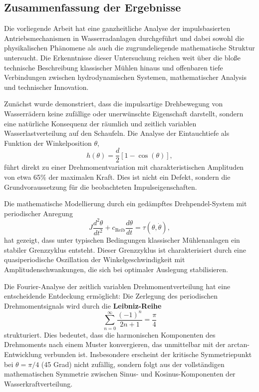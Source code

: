 \documentclass[a4paper,12pt]{article}
\theoremstyle{definition}
\begin{document}
\subsection{Zusammenfassung der Ergebnisse}

Die vorliegende Arbeit hat eine ganzheitliche Analyse der impulsbasierten Antriebsmechanismen in Wasserradanlagen durchgeführt und dabei sowohl die physikalischen Phänomene als auch die zugrundeliegende mathematische Struktur untersucht. Die Erkenntnisse dieser Untersuchung reichen weit über die bloße technische Beschreibung klassischer Mühlen hinaus und offenbaren tiefe Verbindungen zwischen hydrodynamischen Systemen, mathematischer Analysis und technischer Innovation.

Zunächst wurde demonstriert, dass die impulsartige Drehbewegung von Wasserrädern keine zufällige oder unerwünschte Eigenschaft darstellt, sondern eine natürliche Konsequenz der räumlich und zeitlich variablen Wasserlastverteilung auf den Schaufeln. Die Analyse der Eintauchtiefe als Funktion der Winkelposition $\theta$,
\begin{equation}
  h(\theta) = \frac{d}{2}[1 - \cos(\theta)],
\end{equation}
führt direkt zu einer Drehmomentvariation mit charakteristischen Amplituden von etwa 65\% der maximalen Kraft. Dies ist nicht ein Defekt, sondern die Grundvoraussetzung für die beobachteten Impulseigenschaften.

Die mathematische Modellierung durch ein gedämpftes Drehpendel-System mit periodischer Anregung
\begin{equation}
  J \frac{d^2\theta}{dt^2} + c_{\text{Reib}} \frac{d\theta}{dt} = \tau(\theta, \dot{\theta}),
\end{equation}
hat gezeigt, dass unter typischen Bedingungen klassischer Mühlenanlagen ein stabiler Grenzzyklus entsteht. Dieser Grenzzyklus ist charakterisiert durch eine quasiperiodische Oszillation der Winkelgeschwindigkeit mit Amplitudenschwankungen, die sich bei optimaler Auslegung stabilisieren.

Die Fourier-Analyse der zeitlich variablen Drehmomentverteilung hat eine entscheidende Entdeckung ermöglicht: Die Zerlegung des periodischen Drehmomentsignals wird durch die \textbf{Leibniz-Reihe}
\begin{equation}
  \sum_{n=0}^{\infty} \frac{(-1)^n}{2n+1} = \frac{\pi}{4}
\end{equation}
strukturiert. Dies bedeutet, dass die harmonischen Komponenten des Drehmoments nach einem Muster konvergieren, das unmittelbar mit der arctan-Entwicklung verbunden ist. Insbesondere erscheint der kritische Symmetriepunkt bei $\theta = \pi/4$ (45 Grad) nicht zufällig, sondern folgt aus der vollständigen mathematischen Symmetrie zwischen Sinus- und Kosinus-Komponenten der Wasserkraftverteilung.
\end{document}
